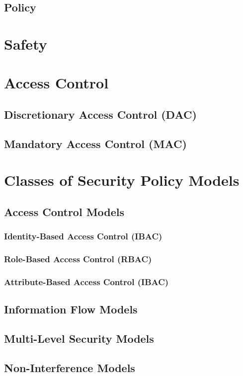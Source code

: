 \subsection{Policy}

\section{Safety}
\label{sec:safety}

\section{Access Control}
\label{sec:accesscontrol}

\subsection{Discretionary Access Control (DAC)}

\subsection{Mandatory Access Control (MAC)}

\section{Classes of Security Policy Models}
\label{sec:securitypolicymodels}

\subsection{Access Control Models}
\subsubsection{Identity-Based Access Control (IBAC)}
\subsubsection{Role-Based Access Control (RBAC)}
\subsubsection{Attribute-Based Access Control (IBAC)}

\subsection{Information Flow Models}

\subsection{Multi-Level Security Models}

\subsection{Non-Interference Models}
